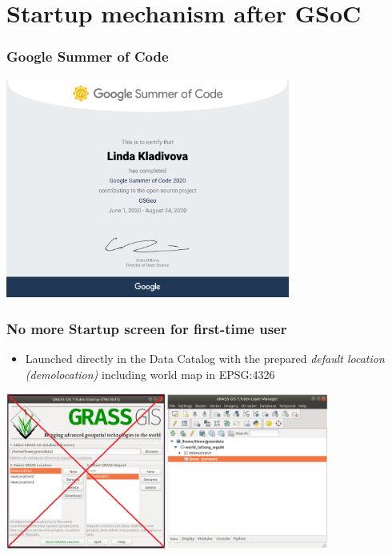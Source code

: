 \documentclass[aspectratio=169]{beamer}
\begin{document}
\section{Startup mechanism after GSoC}

\begin{frame}
\frametitle{Google Summer of Code}
	\centering
        \includegraphics[width=0.7\textwidth]{pictures/Certificate.pdf}
\end{frame}

\begin{frame}
\frametitle{No more Startup screen for first-time user}
\begin{itemize}
\item Launched directly in the Data Catalog with the prepared \textit{default location (demolocation)} including world map in EPSG:4326
\end{itemize}
	\centering
        \includegraphics[width=0.8\textwidth]{pictures/demolocation_startup.PNG}
\end{frame}
\end{document}
